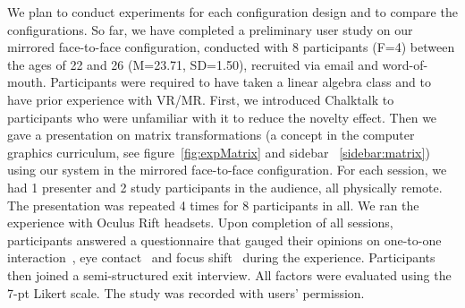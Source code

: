 \documentclass[sigchi-a]{acmart}
\begin{document}
We plan to conduct experiments for each configuration design and to compare the configurations. So far, we have completed a preliminary user study on our mirrored face-to-face configuration, conducted with 8 participants (F=4) between the ages of 22 and 26 (M=23.71, SD=1.50), recruited via email and word-of-mouth.
Participants were required to have taken a linear algebra class and to have prior experience with VR/MR. First, we introduced Chalktalk to participants who were unfamiliar with it to reduce the novelty effect. Then we gave a presentation on matrix transformations (a concept in the computer graphics curriculum, see figure~\ref{fig:expMatrix} and sidebar ~\ref{sidebar:matrix}) using our system in the mirrored face-to-face configuration. For each session, we had 1 presenter and 2 study participants in the audience, all physically remote. The presentation was repeated 4 times for 8 participants in all.
We ran the experience with Oculus Rift headsets. Upon completion of all sessions, participants answered a questionnaire that gauged their opinions on one-to-one interaction~\cite{Lanir2008ClassroomPresentationSoftware}, eye contact~\cite{InsaPositionInClassroom} and focus shift~\cite{buxton1992telepresence} during the experience. Participants then joined a semi-structured exit interview. All factors were evaluated using the 7-pt Likert scale. The study was recorded with users' permission.

\end{document}
